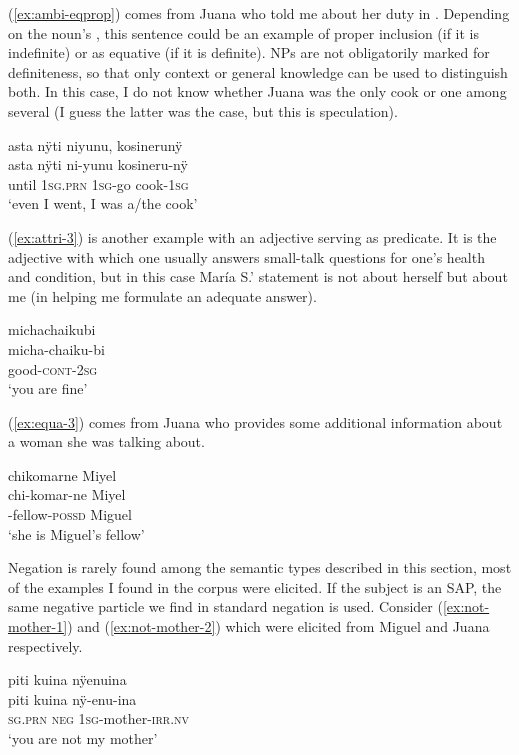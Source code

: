 (\ref{ex:ambi-eqprop}) comes from Juana who told me about her duty in . Depending on the noun’s , this sentence could be an example of proper inclusion (if it is indefinite) or as equative (if it is definite). NPs are not obligatorily marked for definiteness, so that only context or general knowledge can be used to distinguish both. In this case, I do not know whether Juana was the only cook or one among several (I guess the latter was the case, but this is speculation). 

\ea\label{ex:ambi-eqprop}
\begingl
\glpreamble asta nÿti niyunu, kosinerunÿ\\
\gla asta nÿti ni-yunu kosineru-nÿ\\
\glb until 1\textsc{sg.prn} 1\textsc{sg}-go cook-1\textsc{sg}\\
\glft ‘even I went, I was a/the cook’
\endgl
\trailingcitation{[jxx-p120515l-2.085-086]}
\xe

(\ref{ex:attri-3}) is another example with an adjective serving as predicate. It is the adjective with which one usually answers small-talk questions for one’s health and condition, but in this case María S.’  statement is not about herself but about me (in helping me formulate an adequate answer).

\ea\label{ex:attri-3}
\begingl
\glpreamble michachaikubi\\
\gla micha-chaiku-bi\\
\glb good-\textsc{cont}-2\textsc{sg}\\
\glft ‘you are fine’
\endgl
\trailingcitation{[rmx-e150922l.016]}
\xe

(\ref{ex:equa-3}) comes from Juana who provides some additional information about a woman she was talking about.

\ea\label{ex:equa-3}
\begingl
\glpreamble chikomarne Miyel\\
\gla chi-komar-ne Miyel\\
-fellow-\textsc{possd} Miguel\\
\glft ‘she is Miguel’s fellow’
\endgl
\trailingcitation{[jxx-p120430l-2.342]}
\xe


Negation is rarely found among the semantic types described in this section, most of the examples I found in the corpus were elicited. If the subject is an SAP, the same negative particle we find in standard negation is used. Consider (\ref{ex:not-mother-1}) and (\ref{ex:not-mother-2}) which were elicited from Miguel and Juana respectively.

\ea\label{ex:not-mother-1}
\begingl
\glpreamble piti kuina nÿenuina\\
\gla piti kuina nÿ-enu-ina\\
\textsc{sg.prn} \textsc{neg} 1\textsc{sg}-mother-\textsc{irr.nv}\\
\glft ‘you are not my mother’
\endgl
\trailingcitation{[rmx-e150922l.100]}
\xe

